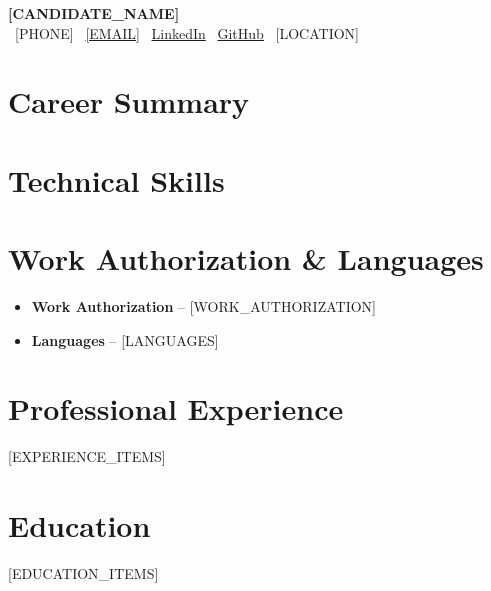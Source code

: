 \documentclass[a4paper,10pt]{article}
\begin{document}
\noindent
\begin{minipage}[t]{0.98\textwidth}
\vspace{0pt}
{\huge\bfseries [CANDIDATE_NAME]}\\[8pt]
{\small \faPhone\ [PHONE] \quad \faEnvelope\ \href{mailto:[EMAIL]}{[EMAIL]} \quad \faLinkedin\ \href{[LINKEDIN_URL]}{LinkedIn} \quad \faGithub\ \href{[GITHUB_URL]}{GitHub} \quad \faMapMarker*\ [LOCATION]}
\end{minipage}

\section{Career Summary}
\begin{itemize}
\end{itemize}

\section{Technical Skills}
\begin{itemize}
\end{itemize}

\section{Work Authorization \& Languages}
\begin{itemize}
\item \textbf{Work Authorization} -- [WORK_AUTHORIZATION]
\item \textbf{Languages} -- [LANGUAGES]
\end{itemize}

\section{Professional Experience}
[EXPERIENCE_ITEMS]

\section{Education}
[EDUCATION_ITEMS]
\end{document}
